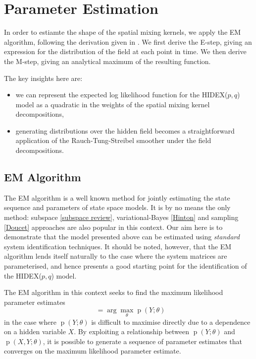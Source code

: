 \documentclass{IEEEtran}
\DeclareMathOperator{\p}{p}
\DeclareMathOperator{\thetaML}{\theta_{\mathrm{ML}}}
\begin{document}
\section{Parameter Estimation}

In order to estiamte the shape of the spatial mixing kernels, we apply the EM algorithm, following the derivation given in \cite{GibsonNinness}. We first derive the E-step, giving an expression for the distribution of the field at each point in time. We then derive the M-step, giving an analytical maximum of the resulting function.

The key insights here are:
\begin{itemize}
	\item we can represent the expected log likelihood function for the HIDEX($p,q$) model as a quadratic in the weights of the spatial mixing kernel decompositions,
	\item generating distributions over the hidden field becomes a straightforward application of the Rauch-Tung-Streibel smoother \cite{Rauch} under the field decompositions.
\end{itemize} 

\subsection{EM Algorithm}

The EM algorithm is a well known method for jointly estimating the state sequence and parameters of state space models. It is by no means the only method: subspace \ref{subspace review}, variational-Bayes \ref{Hinton} and sampling \ref{Doucet} approaches are also popular in this context. Our aim here is to demonstrate that the model presented above can be estimated using \emph{standard} system identification techniques. It should be noted, however, that the EM algorithm lends itself naturally to the case where the system matrices are parameterised, and hence presents a good starting point for the identification of the HIDEX($p,q$) model.

The EM algorithm in this context seeks to find the maximum likelihood parameter estimates 
\begin{equation}
\thetaML=\arg\max_{\theta} \p (Y ; \theta)
\end{equation}
in the case where $\p(Y;\theta)$ is difficult to maximise directly due to a dependence on a hidden variable $X$. By exploiting a relationship between $\p(Y; \theta)$ and $\p(X,Y; \theta)$, it is possible to generate a sequence of parameter estimates that converges on the maximum likelihood parameter estimate.
\end{document}
